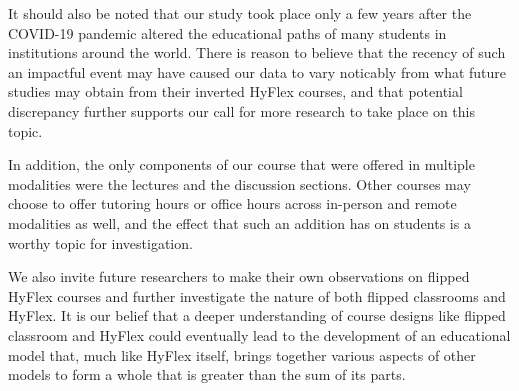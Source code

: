 It should also be noted that our study took place only a few years after the COVID-19 pandemic altered the educational paths of many students in institutions around the world. There is reason to believe that the recency of such an impactful event may have caused our data to vary noticably from what future studies may obtain from their inverted HyFlex courses, and that potential discrepancy further supports our call for more research to take place on this topic.

In addition, the only components of our course that were offered in multiple modalities were the lectures and the discussion sections. Other courses may choose to offer tutoring hours or office hours across in-person and remote modalities as well, and the effect that such an addition has on students is a worthy topic for investigation.

We also invite future researchers to make their own observations on flipped HyFlex courses and further investigate the nature of both flipped classrooms and HyFlex. It is our belief that a deeper understanding of course designs like flipped classroom and HyFlex could eventually lead to the development of an educational model that, much like HyFlex itself, brings together various aspects of other models to form a whole that is greater than the sum of its parts.